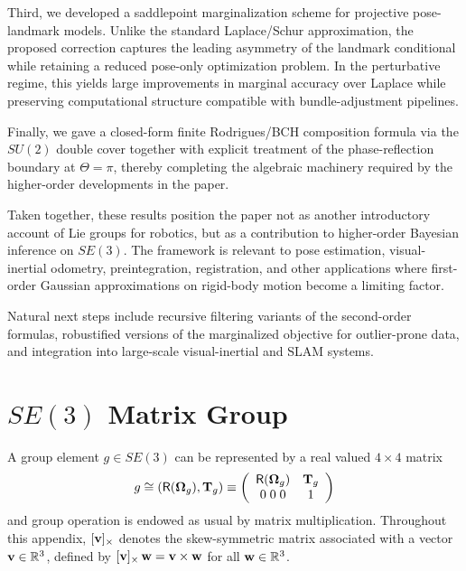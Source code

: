 \documentclass[journal]{IEEEtran}
\newcommand{\real}{\mathbb{R}}
\newcommand{\bfOmega}{\boldsymbol{\Omega}}
\newcommand{\beq}{\begin{equation}}
\newcommand{\eeq}{\end{equation}}
\begin{document}
Third, we developed a saddlepoint marginalization scheme for
projective pose-landmark models. Unlike the standard
Laplace/Schur approximation, the proposed correction captures
the leading asymmetry of the landmark conditional while
retaining a reduced pose-only optimization problem. In the
perturbative regime, this yields large improvements in marginal
accuracy over Laplace while preserving computational
structure compatible with bundle-adjustment pipelines.

Finally, we gave a closed-form finite Rodrigues/BCH
composition formula via the $SU(2)$ double cover together
with explicit treatment of the phase-reflection boundary at
$\Theta=\pi$, thereby completing the algebraic machinery
required by the higher-order developments in the paper.

Taken together, these results position the paper not as another
introductory account of Lie groups for robotics, but as a
contribution to higher-order Bayesian inference on $SE(3)$.
The framework is relevant to pose estimation, visual-inertial
odometry, preintegration, registration, and other applications
where first-order Gaussian approximations on rigid-body
motion become a limiting factor.

Natural next steps include recursive filtering variants of the
second-order formulas, robustified versions of the marginalized
objective for outlier-prone data, and integration into large-scale
visual-inertial and SLAM systems.

\appendix

\section{$SE(3)$ Matrix Group}
\label{app:SE3group}
A group element $g\in SE(3)$ can be represented by a real valued $4\times 4$ matrix
\beq
    g \cong (\mathsf{R}(\bfOmega_g),{\bf T}_g) \equiv \left(
    \begin{array}{cc}
        \mathsf{R}(\bfOmega_g) & {\bf T}_g \\
        0\; 0\; 0 & 1
    \end{array} \right) \label{eq:SE3matrixrepresentation}
\eeq
and group operation is endowed as usual by matrix multiplication.
Throughout this appendix, $[{\bf v}]_\times$ denotes the skew-symmetric matrix associated
with a vector ${\bf v}\in\real^3$, defined by $[{\bf v}]_\times\,{\bf w} = {\bf v}\times{\bf w}$
for all ${\bf w}\in\real^3$.
\end{document}
